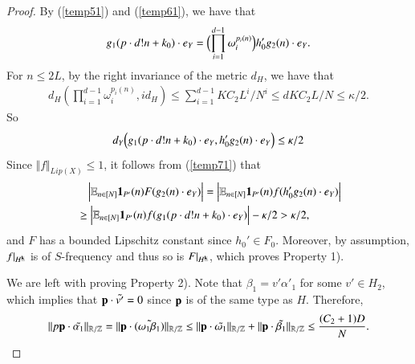 \documentclass[12pt,amstex]{amsart}
\theoremstyle{definition}
\def \A {\alpha}
\def \B {\beta}
\def \D {\kappa}
\def \k {\bold{k}}
\begin{document}
\begin{proof}
By (\ref{temp51}) and (\ref{temp61}), we have that
       \begin{equation}\nonumber
    \begin{split}
     g_{1}(p\cdot d!n+k_{0})\cdot e_{Y}=\Bigl(\prod_{i=1}^{d-1}\omega_{i}^{p_{i}(n)}\Bigr)h_{0}'g_{2}(n)\cdot e_{Y}.
    \end{split}
  \end{equation}
  For $n\leq 2L$, by the right invariance of the metric $d_{H}$, we have that
       \begin{equation}\nonumber
    \begin{split}
     d_{H}(\prod_{i=1}^{d-1}\omega_{i}^{p_{i}(n)},id_{H})\leq \sum_{i=1}^{d-1}KC_{2}L^{i}/N^{i}\leq dKC_{2}L/N\leq\D/2.
    \end{split}
  \end{equation}
So
  \begin{equation}\nonumber
    \begin{split}
     d_{Y}\Bigl(g_{1}(p \cdot d!n+k_{0})\cdot e_{Y},h_{0}'g_{2}(n)\cdot e_{Y}\Bigr)\leq\D/2
    \end{split}
  \end{equation}
  Since $\Vert f\Vert_{Lip(X)}\leq 1$, it follows from (\ref{temp71}) that
     \begin{equation}\nonumber
    \begin{split}
     &\quad\Bigl\vert\mathbb{E}_{n\in[N]}\bold{1}_{P'}(n)F(g_{2}(n)\cdot e_{Y})\Bigr\vert
=\Bigl\vert\mathbb{E}_{n\in[N]}\bold{1}_{P'}(n)f(h_{0}'g_{2}(n)\cdot e_{Y})\Bigr\vert
\\&\geq \Bigl\vert\mathbb{E}_{n\in[N]}\bold{1}_{P'}(n)f(g_{1}(p \cdot d!n+k_{0})\cdot e_{Y})\Bigr\vert-\D/2>\D/2,
    \end{split}
  \end{equation}
  and $F$ has a bounded Lipschitz constant since $h_{0}'\in F_{0}$. Moreover, by assumption, $f|_{H^{\underline{\k}}}$ is of $S$-frequency and thus so is $F|_{H^{\underline{\k}}}$, which proves
  Property 1).

   We are left with proving Property 2). Note that $\B_{1}=v'\A'_{1}$ for some $v'\in H_{2}$, which implies that $\bold{p}\cdot\tilde{v'}=0$ since $\bold{p}$ is of the same type as $H$. Therefore,
  \begin{equation}\nonumber
    \begin{split}
    \Vert p\bold{p}\cdot\tilde{\A_{1}}\Vert_{\mathbb{R}/\mathbb{Z}}=
  \Vert\bold{p}\cdot\tilde{(\omega_{1}\B_{1})}\Vert_{\mathbb{R}/\mathbb{Z}}
  \leq
  \Vert\bold{p}\cdot\tilde{\omega_{1}}\Vert_{\mathbb{R}/\mathbb{Z}}
  +\Vert\bold{p}\cdot\tilde{\B_{1}}\Vert_{\mathbb{R}/\mathbb{Z}}
  \leq\frac{(C_{2}+1)D}{N}.
      \end{split}
  \end{equation}
\end{proof}
\end{document}
